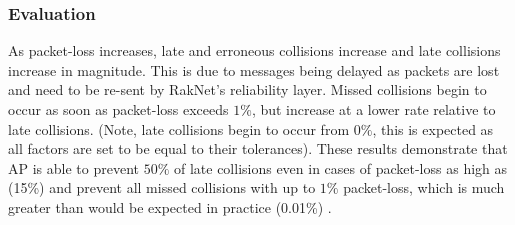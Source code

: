 \subsubsection{Evaluation}
As packet-loss increases, late and erroneous collisions increase and late collisions increase in magnitude. This is due to messages being delayed as packets are lost and need to be re-sent by RakNet's reliability layer. Missed collisions begin to occur as soon as packet-loss exceeds $1\%$, but increase at a lower rate relative to late collisions. (Note, late collisions begin to occur from $0\%$, this is expected as all factors are set to be equal to their tolerances). These results demonstrate that AP is able to prevent $50\%$ of late collisions even in cases of packet-loss as high as (15\%) and prevent all missed collisions with up to $1\%$ packet-loss, which is much greater than would be expected in practice (0.01\%) \cite{ThousandEyesCloudPerf2018}.
